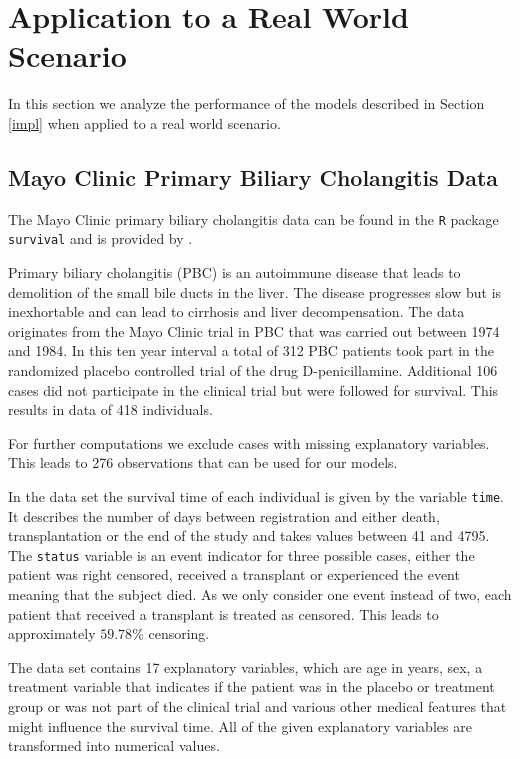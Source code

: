 \documentclass[12pt, a4paper]{scrartcl}
\theoremstyle{definition}
\theoremstyle{plain}
\numberwithin{equation}{section}
\numberwithin{figure}{section}
\numberwithin{table}{section}
\begin{document}
	\newpage
	\section{Application to a Real World Scenario}
	In this section we analyze the performance of the models described in Section \ref{impl} when applied to a real world scenario.
	
	\subsection{Mayo Clinic Primary Biliary Cholangitis Data}
	The Mayo Clinic primary biliary cholangitis data can be found in the \texttt{R} package \texttt{survival} and is provided by \citet*{survival-book}.
	
	Primary biliary cholangitis (PBC) is an autoimmune disease that leads to demolition of the small bile ducts in the liver.
	The disease progresses slow but is inexhortable and can lead to cirrhosis and liver decompensation.
	The data originates from the Mayo Clinic trial in PBC that was carried out between 1974 and 1984.
	In this ten year interval a total of 312 PBC patients took part in the randomized placebo controlled trial of the drug D-penicillamine.
	Additional 106 cases did not participate in the clinical trial but were followed for survival.
	This results in data of 418 individuals.
	
	For further computations we exclude cases with missing explanatory variables.
	This leads to 276 observations that can be used for our models.
	
	In the data set the survival time of each individual is given by the variable \texttt{time}.
	It describes the number of days between registration and either death, transplantation or the end of the study and takes values between 41 and 4795.
	The \texttt{status} variable is an event indicator for three possible cases, either the patient was right censored, received a transplant or experienced the event meaning that the subject died.
	As we only consider one event instead of two, each patient that received a transplant is treated as censored.
	This leads to approximately $59.78\%$ censoring.
	
	The data set contains 17 explanatory variables, which are age in years, sex, a treatment variable that indicates if the patient was in the placebo or treatment group or was not part of the clinical trial and various other medical features that might influence the survival time.
	All of the given explanatory variables are transformed into numerical values.
	
\end{document}
